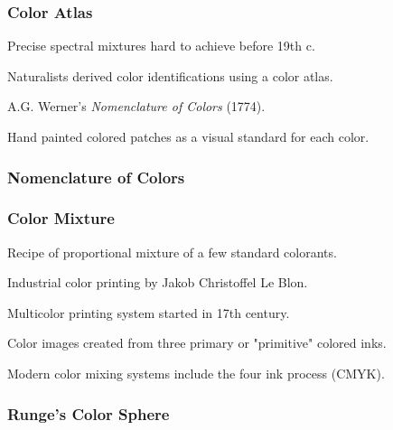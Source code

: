 \documentclass[12pt]{beamer}\usepackage[]{graphicx}\usepackage[]{color}
\begin{document}

\begin{frame}
\frametitle{Color Atlas}

\bbi
  \item Precise spectral mixtures hard to achieve before 19th c.
  \item Naturalists derived color identifications using a color atlas.
  \item A.G. Werner's \textit{Nomenclature of Colors} (1774).
  \item Hand painted colored patches as a visual standard for each color.
\ei

\end{frame}


\begin{frame}
\frametitle{Nomenclature of Colors}
\begin{center}
\end{center}
\end{frame}


\begin{frame}
\frametitle{Color Mixture}

\bbi
  \item Recipe of proportional mixture of a few standard colorants.
  \item Industrial color printing by Jakob Christoffel Le Blon.
  \item Multicolor printing system started in 17th century.
  \item Color images created from three primary or "primitive" colored inks.
  \item Modern color mixing systems include the four ink process (CMYK).
\ei

\end{frame}


\begin{frame}
\frametitle{Runge's Color Sphere}
\begin{center}
\end{center}
\end{frame}

\end{document}
